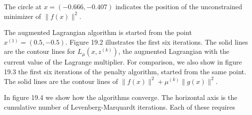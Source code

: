 The circle at \(x=(-0.666,-0.407)\) indicates the position of the unconstrained minimizer of \(\|f(x)\|^{2}\).

The augmented Lagrangian algorithm is started from the point \(x^{(1)}=(0.5,-0.5)\). Figure 19.2 illustrates the first six iterations. The solid lines are the contour lines for \(L_{\mu}(x,z^{(k)})\), the augmented Lagrangian with the current value of the Lagrange multiplier. For comparison, we also show in figure 19.3 the first six iterations of the penalty algorithm, started from the same point. The solid lines are the contour lines of \(\|f(x)\|^{2}+\mu^{(k)}\|g(x)\|^{2}\).

In figure 19.4 we show how the algorithms converge. The horizontal axis is the cumulative number of Levenberg-Marquardt iterations. Each of these requires